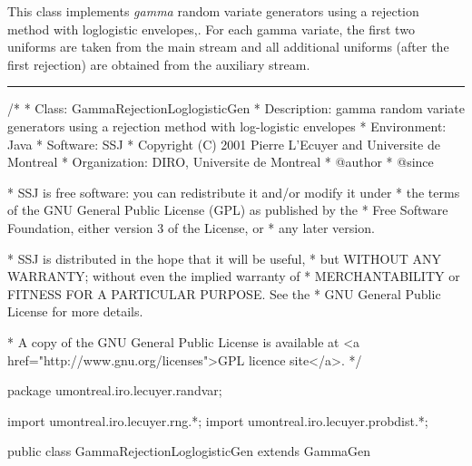
This class implements {\em gamma\/} random variate generators using
 a rejection method with loglogistic envelopes,.
For each gamma variate, the first two uniforms are taken from the 
main stream and all additional uniforms (after the first rejection)
are obtained from the auxiliary stream.

\bigskip\hrule

\begin{code}
\begin{hide}
/*
 * Class:        GammaRejectionLoglogisticGen
 * Description:  gamma random variate generators using a rejection method
                 with log-logistic envelopes
 * Environment:  Java
 * Software:     SSJ 
 * Copyright (C) 2001  Pierre L'Ecuyer and Universite de Montreal
 * Organization: DIRO, Universite de Montreal
 * @author       
 * @since

 * SSJ is free software: you can redistribute it and/or modify it under
 * the terms of the GNU General Public License (GPL) as published by the
 * Free Software Foundation, either version 3 of the License, or
 * any later version.

 * SSJ is distributed in the hope that it will be useful,
 * but WITHOUT ANY WARRANTY; without even the implied warranty of
 * MERCHANTABILITY or FITNESS FOR A PARTICULAR PURPOSE.  See the
 * GNU General Public License for more details.

 * A copy of the GNU General Public License is available at
   <a href="http://www.gnu.org/licenses">GPL licence site</a>.
 */
\end{hide}
package umontreal.iro.lecuyer.randvar;\begin{hide}
import umontreal.iro.lecuyer.rng.*;
import umontreal.iro.lecuyer.probdist.*;
\end{hide}

public class GammaRejectionLoglogisticGen extends GammaGen \begin{hide} {
    
   private RandomStream auxStream;

   // UNURAN parameters for the distribution
   private double beta;
   private double gamma;
   // Generator parameters
   // Rejection with log-logistic envelopes
   private double aa;
   private double bb;
   private double cc;
\end{hide}
\end{code}

